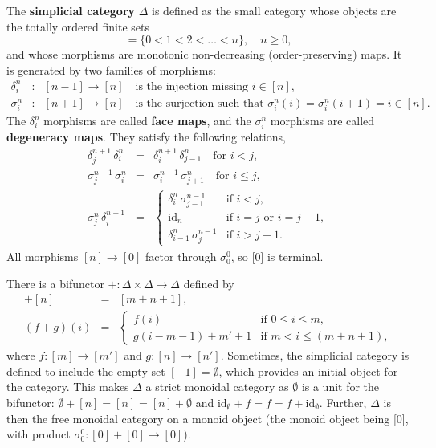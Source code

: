 \documentclass[12pt]{article}
\newcommand*{\id}{\mathrm{id}}
\theoremstyle{inlinedefn}
\theoremstyle{break}
\newcommand*{\defn}[1]{\textbf{#1}}
\begin{document}
The \textbf{simplicial category} $\Delta$ is defined as the small category
whose objects are the totally ordered finite sets
\begin{equation}
[n] = \{0<1<2<\ldots<n\}, \quad n\geq0,
\end{equation}
and whose morphisms are monotonic non-decreasing (order-preserving) maps.
It is generated by two families of morphisms:
\begin{eqnarray*}
\delta^n_i & \colon & [n-1] \to [n] \quad\mbox{is the injection missing\ } i\in[n], \\
\sigma^n_i & \colon & [n+1] \to [n] \quad\mbox{is the surjection such that\ } \sigma^n_i(i)=\sigma^n_i(i+1)=i\in[n].
\end{eqnarray*}
The $\delta^n_i$ morphisms are called \defn{face maps},
and the $\sigma^n_i$ morphisms are called \defn{degeneracy maps}.
They satisfy the following relations,
\begin{eqnarray}
\delta^{n+1}_j\,\delta^n_i & = & \delta^{n+1}_i\,\delta^n_{j-1}
\quad\mbox{for\ } i<j, \\
\sigma^{n-1}_j\,\sigma^n_i & = & \sigma^{n-1}_i\,\sigma^n_{j+1}
\quad\mbox{for\ } i\leq j, \\
\sigma^n_j\,\delta^{n+1}_i & = & \left\{
\begin{array}{ll}
\delta^n_i\,\sigma^{n-1}_{j-1} & \mbox{if\ } i<j, \\
\id_n & \mbox{if\ } i=j \mbox{\ or\ } i=j+1, \\
\delta^n_{i-1}\,\sigma^{n-1}_j & \mbox{if\ }i>j+1.
\end{array}\right.
\end{eqnarray}
All morphisms $[n] \to [0]$ factor through $\sigma^0_0$,
so [0] is terminal.

There is a bifunctor $+\colon \Delta\times\Delta \to \Delta$ defined by
\begin{eqnarray}
[m]+[n] & = & [m+n+1], \\
(f+g)(i) & = & \left\{
\begin{array}{ll}
f(i) & \mbox{if\ } 0 \leq i \leq m, \\
g(i-m-1)+m'+1 & \mbox{if\ } m < i \leq (m+n+1),
\end{array}\right.
\end{eqnarray}
where $f\colon [m] \to [m']$ and $g\colon [n] \to [n']$.
Sometimes, the simplicial category is defined to include the
empty set $[-1] = \emptyset$, which provides an initial object for the category.
This makes $\Delta$ a strict monoidal category as $\emptyset$
is a unit for the bifunctor: $\emptyset+[n] = [n] = [n]+\emptyset$
and $\id_\emptyset+f = f = f+\id_\emptyset$.
Further, $\Delta$ is then the free monoidal category on a monoid object
(the monoid object being [0], with product $\sigma^0_0\colon [0]+[0] \to [0]$).
\end{document}
